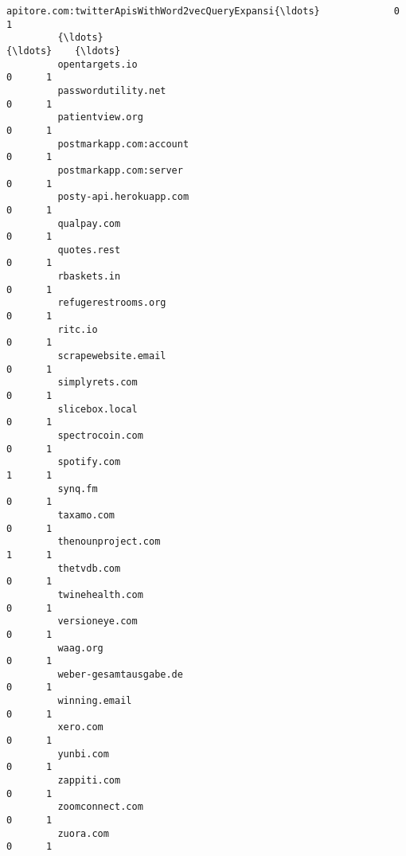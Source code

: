\documentclass[11pt]{article}
\begin{document}
\begin{Verbatim}[commandchars=\\\{\}]
         apitore.com:twitterApisWithWord2vecQueryExpansi{\ldots}             0      1   
         {\ldots}                                                          {\ldots}    {\ldots}   
         opentargets.io                                                 0      1   
         passwordutility.net                                            0      1   
         patientview.org                                                0      1   
         postmarkapp.com:account                                        0      1   
         postmarkapp.com:server                                         0      1   
         posty-api.herokuapp.com                                        0      1   
         qualpay.com                                                    0      1   
         quotes.rest                                                    0      1   
         rbaskets.in                                                    0      1   
         refugerestrooms.org                                            0      1   
         ritc.io                                                        0      1   
         scrapewebsite.email                                            0      1   
         simplyrets.com                                                 0      1   
         slicebox.local                                                 0      1   
         spectrocoin.com                                                0      1   
         spotify.com                                                    1      1   
         synq.fm                                                        0      1   
         taxamo.com                                                     0      1   
         thenounproject.com                                             1      1   
         thetvdb.com                                                    0      1   
         twinehealth.com                                                0      1   
         versioneye.com                                                 0      1   
         waag.org                                                       0      1   
         weber-gesamtausgabe.de                                         0      1   
         winning.email                                                  0      1   
         xero.com                                                       0      1   
         yunbi.com                                                      0      1   
         zappiti.com                                                    0      1   
         zoomconnect.com                                                0      1   
         zuora.com                                                      0      1   
         

\end{Verbatim}
\end{document}
